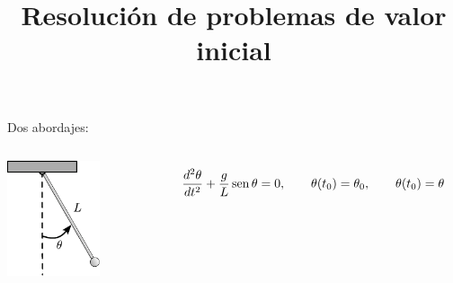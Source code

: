 \documentclass[9pt, aspectratio=169]{beamer}
\title{Resolución de problemas de valor inicial}
\subtitle{}
\begin{document}
\maketitle

\begin{frame}{Dos abordajes:}
\begin{columns}[]
    \begin{center}
      \includegraphics[width=0.6\textwidth]{figs/pendulo.pdf}
    \end{center}
    \[ \frac{d^2 \theta}{dt^2} + \frac{g}{L} \operatorname{sen} \theta = 0, \qquad \theta(t_0) = \theta_0, \qquad \theta  (t_0) = \theta \]
\end{columns}
\end{frame}
\end{document}
